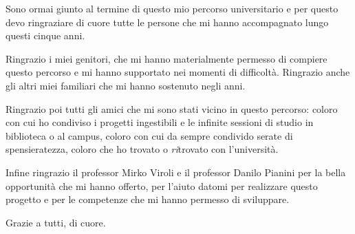 
Sono ormai giunto al termine di questo mio percorso universitario
e per questo devo ringraziare di cuore tutte le persone che mi hanno accompagnato lungo questi cinque anni.

Ringrazio i miei genitori, che mi hanno materialmente permesso di compiere questo percorso e mi hanno supportato nei momenti di difficoltà.
Ringrazio anche gli altri miei familiari che mi hanno sostenuto negli anni.

Ringrazio poi tutti gli amici che mi sono stati vicino in questo percorso:
coloro con cui ho condiviso i progetti ingestibili e le infinite sessioni di studio in biblioteca o al campus,
coloro con cui da sempre condivido serate di spensieratezza,
coloro che ho trovato o \emph{ri}trovato con l'università.

Infine ringrazio il professor Mirko Viroli e il professor Danilo Pianini
per la bella opportunità che mi hanno offerto,
per l'aiuto datomi per realizzare questo progetto
e per le competenze che mi hanno permesso di sviluppare.

Grazie a tutti, di cuore.
